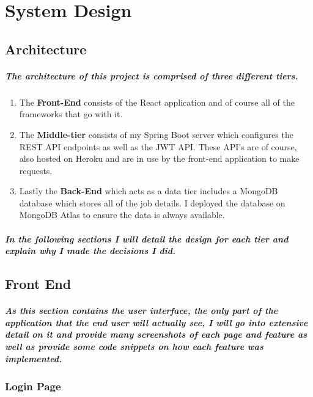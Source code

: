 \chapter{System Design}
\section{Architecture}%
\paragraph{The architecture of this project is comprised of three different tiers.}
\begin{enumerate}
    \item The \textbf{Front-End} consists of the React application and of course all of the frameworks that go with it.
    \item The \textbf{Middle-tier} consists of my Spring Boot server which configures the REST API endpoints as well as the JWT API. These API's are of course, also hosted on Heroku and are in use by the front-end application to make requests.
    \item Lastly the \textbf{Back-End} which acts as a data tier includes a MongoDB database which stores all of the job details. I deployed the database on MongoDB Atlas to ensure the data is always available.
\end{enumerate}
\paragraph{In the following sections I will detail the design for each tier and explain why I made the decisions I did.}

\section{Front End}
\paragraph{As this section contains the user interface, the only part of the application that the end user will actually see, I will go into extensive detail on it and provide many screenshots of each page and feature as well as provide some code snippets on how each feature was implemented.}
\subsection{Login Page}

